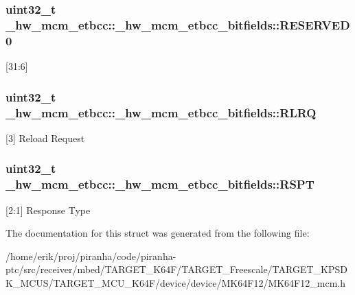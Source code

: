 \subsubsection[{\texorpdfstring{R\+E\+S\+E\+R\+V\+E\+D0}{RESERVED0}}]{\setlength{\rightskip}{0pt plus 5cm}uint32\+\_\+t \+\_\+hw\+\_\+mcm\+\_\+etbcc\+::\+\_\+hw\+\_\+mcm\+\_\+etbcc\+\_\+bitfields\+::\+R\+E\+S\+E\+R\+V\+E\+D0}\hypertarget{struct__hw__mcm__etbcc_1_1__hw__mcm__etbcc__bitfields_af8390b3043efb76483ca3f0a59f92e0f}{}\label{struct__hw__mcm__etbcc_1_1__hw__mcm__etbcc__bitfields_af8390b3043efb76483ca3f0a59f92e0f}
\mbox{[}31\+:6\mbox{]} 
\subsubsection[{\texorpdfstring{R\+L\+RQ}{RLRQ}}]{\setlength{\rightskip}{0pt plus 5cm}uint32\+\_\+t \+\_\+hw\+\_\+mcm\+\_\+etbcc\+::\+\_\+hw\+\_\+mcm\+\_\+etbcc\+\_\+bitfields\+::\+R\+L\+RQ}\hypertarget{struct__hw__mcm__etbcc_1_1__hw__mcm__etbcc__bitfields_a4ed1b7ff377a585ac0be9db1d1b95fb7}{}\label{struct__hw__mcm__etbcc_1_1__hw__mcm__etbcc__bitfields_a4ed1b7ff377a585ac0be9db1d1b95fb7}
\mbox{[}3\mbox{]} Reload Request 
\subsubsection[{\texorpdfstring{R\+S\+PT}{RSPT}}]{\setlength{\rightskip}{0pt plus 5cm}uint32\+\_\+t \+\_\+hw\+\_\+mcm\+\_\+etbcc\+::\+\_\+hw\+\_\+mcm\+\_\+etbcc\+\_\+bitfields\+::\+R\+S\+PT}\hypertarget{struct__hw__mcm__etbcc_1_1__hw__mcm__etbcc__bitfields_a773bcdb976b96bd79f2658cb55588fc6}{}\label{struct__hw__mcm__etbcc_1_1__hw__mcm__etbcc__bitfields_a773bcdb976b96bd79f2658cb55588fc6}
\mbox{[}2\+:1\mbox{]} Response Type 

The documentation for this struct was generated from the following file\+:\begin{DoxyCompactItemize}
\item 
/home/erik/proj/piranha/code/piranha-\/ptc/src/receiver/mbed/\+T\+A\+R\+G\+E\+T\+\_\+\+K64\+F/\+T\+A\+R\+G\+E\+T\+\_\+\+Freescale/\+T\+A\+R\+G\+E\+T\+\_\+\+K\+P\+S\+D\+K\+\_\+\+M\+C\+U\+S/\+T\+A\+R\+G\+E\+T\+\_\+\+M\+C\+U\+\_\+\+K64\+F/device/device/\+M\+K64\+F12/M\+K64\+F12\+\_\+mcm.\+h\end{DoxyCompactItemize}
